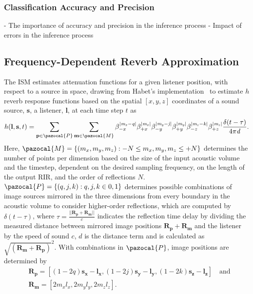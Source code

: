 \subsubsection{Classification Accuracy and Precision}
- The importance of accuracy and precision in the inference process
- Impact of errors in the inference process

\subsection{Frequency-Dependent Reverb Approximation}
The ISM estimates attenuation functions for a given listener position, with respect to a source in space, drawing from Habet's implementation~\citep{habets2006room} to estimate $h$ reverb response functions based on the spatial $[x, y, z]$ coordinates of a sound source, $\mathbf{s}$, a listener, $\mathbf{l}$, at each time step $t$ as 
\begin{equation}\label{eq:ism-base}
    h(\mathbf{l}, \mathbf{s}, t) = \sum_{\mathbf{p} \in \pazocal{P}} \sum_{\mathbf{m} \in \pazocal{M}} \beta_{-x}^{|\mathit{m_x - q}|} \beta_{+x}^{|\mathit{m_x}|} \beta_{-y}^{|\mathit{m_y - j}|} \beta_{+y}^{|\mathit{m_y}|} \beta_{-z}^{|\mathit{m_z - k}|}  \beta_{+z}^{|\mathit{m_z}|} \frac{\delta(t - \tau)}{4\pi \mathit{d}}\textrm{.}
\end{equation}
Here, $\pazocal{M} = \{(m_x, m_y, m_z): -N \leq m_x, m_y, m_z \leq +N\}$ determines the number of points per dimension based on the size of the input acoustic volume and the timestep, dependent on the desired sampling frequency, on the length of the output RIR, and the order of reflections $N$. $\pazocal{P} = \{ (q, j, k): q, j, k \in {0, 1} \}$ determines possible combinations of image sources mirrored in the three dimensions from every boundary in the acoustic volume to consider higher-order reflections, which are computed by $\delta (t - \tau)$, where $\tau = \frac{||\mathbf{R_p} + \mathbf{R_m}||}{c}$ indicates the reflection time delay by dividing the measured distance between mirrored image positions $\mathbf{R_p} + \mathbf{R_m}$ and the listener by the speed of sound $c$, $d$ is the distance term and is calculated as $\sqrt{(\mathbf{R_m}+\mathbf{R_p})}^2$. With combinations in $\pazocal{P}$, image positions are determined by
\begin{align*}
    &\mathbf{R_p} = [ (1 - 2q)\mathbf{s_x} - \mathbf{l_x}, (1 - 2j)\mathbf{s_y} - \mathbf{l_y}, (1 - 2k)\mathbf{s_z} - \mathbf{l_z} ] 
    \quad \textrm{and} \\
    &\mathbf{R_m} = [2 m_x l_x, 2 m_y l_y, 2 m_z l_z]\textrm{.}
\end{align*}

